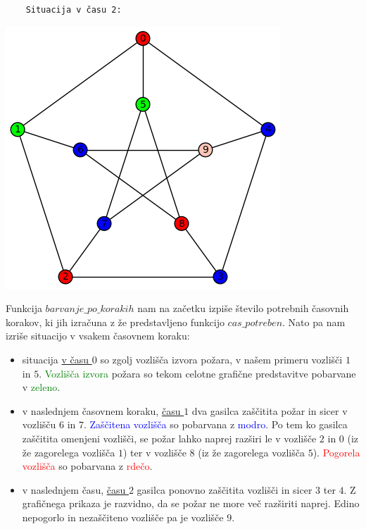\documentclass[a4paper, 12pt]{article}
\begin{document}
\begin{small}
\begin{verbatim}
    Situacija v času 2:
\end{verbatim}
\end{small}
    \begin{center}
        \includegraphics[scale=0.5]{peterson2}
    \end{center}

\noindent Funkcija $barvanje\_po\_korakih$ nam na začetku izpiše število potrebnih 
časovnih korakov, ki jih izračuna z že predstavljeno funkcijo $cas\_potreben$. 
Nato pa nam izriše situacijo v vsakem časovnem koraku:
\begin{itemize}
    \item situacija \underline{v času $0$} so
    zgolj vozlišča izvora požara, v našem primeru vozlišči $1$ in $5$. \textcolor{green}{Vozlišča izvora} 
    požara so tekom celotne grafične predstavitve pobarvane v \textcolor{green}{zeleno}. 
    \item v naslednjem časovnem koraku, \underline{času $1$} dva gasilca zaščitita požar in sicer v vozlišču $6$ in $7$.
    \textcolor{blue}{Zaščitena vozlišča} so pobarvana z \textcolor{blue}{modro}. Po tem ko gasilca zaščitita omenjeni vozlišči, se
    požar lahko naprej razširi le v vozlišče $2$ in $0$ (iz že zagorelega vozlišča $1$) ter v vozlišče $8$ (iz že
    zagorelega vozlišča $5$). \textcolor{red}{Pogorela vozlišča} so pobarvana z \textcolor{red}{rdečo}.
    \item v naslednjem času, \underline{času $2$} gasilca ponovno zaščitita vozlišči in sicer $3$ ter $4$. 
    Z grafičnega prikaza je razvidno, da se požar ne more več razširiti naprej. Edino nepogorlo
    in nezaščiteno vozlišče pa je vozlišče $9$.
\end{itemize}
\end{document}
